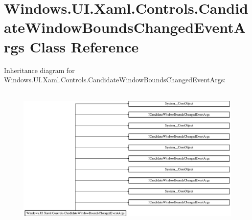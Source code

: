 \hypertarget{class_windows_1_1_u_i_1_1_xaml_1_1_controls_1_1_candidate_window_bounds_changed_event_args}{}\section{Windows.\+U\+I.\+Xaml.\+Controls.\+Candidate\+Window\+Bounds\+Changed\+Event\+Args Class Reference}
\label{class_windows_1_1_u_i_1_1_xaml_1_1_controls_1_1_candidate_window_bounds_changed_event_args}
Inheritance diagram for Windows.\+U\+I.\+Xaml.\+Controls.\+Candidate\+Window\+Bounds\+Changed\+Event\+Args\+:\begin{figure}[H]
\begin{center}
\leavevmode
\includegraphics[height=7.247059cm]{class_windows_1_1_u_i_1_1_xaml_1_1_controls_1_1_candidate_window_bounds_changed_event_args}
\end{center}
\end{figure}
